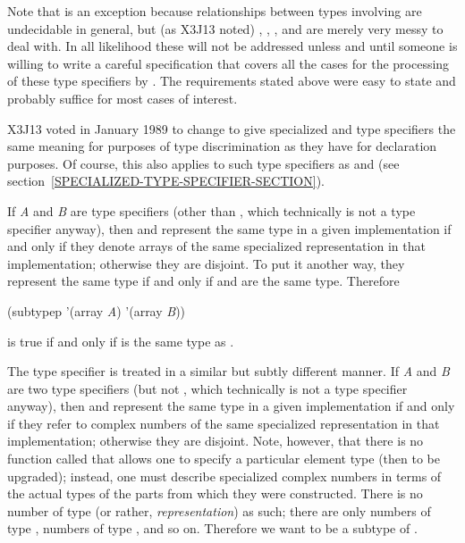 \begin{defun}[Function]
\begin{new}
Note that  is an exception because relationships between
types involving  are undecidable in general, but (as X3J13 noted)
, , , and  are merely very messy to deal
with.  In all likelihood these will not be addressed unless and
until someone is willing to write a careful specification that covers
all the cases for the processing of these type
specifiers by .  The requirements stated above were easy
to state and probably suffice for most cases of interest.
\end{new}

\begin{new}
X3J13 voted in January 1989
to change  to give specialized
 and  type specifiers the same meaning for
purposes of type discrimination as they have for declaration purposes.
Of course, this also applies to such type specifiers as 
and 
(see section~\ref{SPECIALIZED-TYPE-SPECIFIER-SECTION}).

If {\it A} and {\it B} are type specifiers (other than \cd{*}, which technically
is not a type specifier anyway), then 
and  represent the same type in a given implementation
if and only if they denote arrays
of the same specialized representation in that implementation;
otherwise they are disjoint.
To put it another way, they represent the same type
if and only if
 and
 are the same type.
Therefore
\begin{lisp}
(subtypep '(array {\it A}) '(array {\it B}))
\end{lisp}
is true if and only if
is the same type as
.

The  type specifier is treated in a similar but subtly different
manner.
If {\it A} and {\it B} are two type specifiers (but not \cd{*}, which technically
is not a type specifier anyway), then 
and  represent the same type in a given implementation
if and only if they refer to complex numbers
of the same specialized representation in that implementation;
otherwise they are disjoint.
Note, however, that there is no function called  that
allows one to specify a particular element type (then to be upgraded);
instead, one must describe specialized complex numbers in terms of
the actual types of the parts from which they were constructed.
There is no number of type (or rather, {\it representation\/})
 as such; there are only numbers of type ,
numbers of type ,
and so on.  Therefore we want  to
be a subtype of .


\end{new}
\end{defun}
